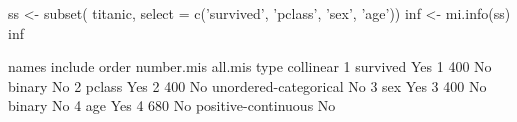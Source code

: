 \begin{Schunk}
\begin{Sinput}
 ss <- subset( titanic,   select = c('survived', 'pclass', 'sex', 'age'))  
 inf <- mi.info(ss)
 inf
\end{Sinput}
\begin{Soutput}
     names include order number.mis all.mis                  type collinear
1 survived     Yes     1        400      No                binary        No
2   pclass     Yes     2        400      No unordered-categorical        No
3      sex     Yes     3        400      No                binary        No
4      age     Yes     4        680      No   positive-continuous        No
\end{Soutput}
\end{Schunk}
